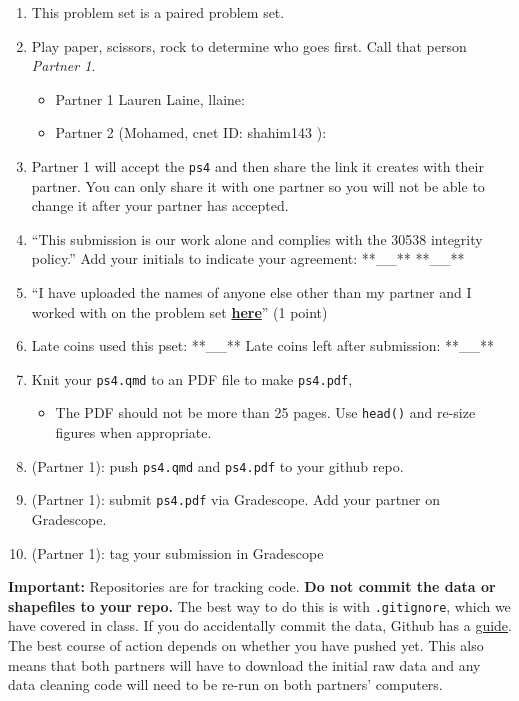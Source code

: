 \documentclass[
  letterpaper,
  DIV=11,
  numbers=noendperiod]{scrartcl}
\providecommand{\tightlist}{%
  \setlength{\itemsep}{0pt}\setlength{\parskip}{0pt}}\usepackage{longtable,booktabs,array}
\begin{document}
\begin{enumerate}
\def\labelenumi{\arabic{enumi}.}
\tightlist
\item
  This problem set is a paired problem set.
\item
  Play paper, scissors, rock to determine who goes first. Call that
  person \emph{Partner 1}.

  \begin{itemize}
  \tightlist
  \item
    Partner 1 Lauren Laine, llaine:
  \item
    Partner 2 (Mohamed, cnet ID: shahim143 ):
  \end{itemize}
\item
  Partner 1 will accept the \texttt{ps4} and then share the link it
  creates with their partner. You can only share it with one partner so
  you will not be able to change it after your partner has accepted.
\item
  ``This submission is our work alone and complies with the 30538
  integrity policy.'' Add your initials to indicate your agreement:
  **\_\_** **\_\_**
\item
  ``I have uploaded the names of anyone else other than my partner and I
  worked with on the problem set
  \textbf{\href{https://docs.google.com/forms/d/185usrCREQaUbvAXpWhChkjghdGgmAZXA3lPWpXLLsts/edit}{here}}''
  (1 point)
\item
  Late coins used this pset: **\_\_** Late coins left after submission:
  **\_\_**
\item
  Knit your \texttt{ps4.qmd} to an PDF file to make \texttt{ps4.pdf},

  \begin{itemize}
  \tightlist
  \item
    The PDF should not be more than 25 pages. Use \texttt{head()} and
    re-size figures when appropriate.
  \end{itemize}
\item
  (Partner 1): push \texttt{ps4.qmd} and \texttt{ps4.pdf} to your github
  repo.
\item
  (Partner 1): submit \texttt{ps4.pdf} via Gradescope. Add your partner
  on Gradescope.
\item
  (Partner 1): tag your submission in Gradescope
\end{enumerate}

\textbf{Important:} Repositories are for tracking code. \textbf{Do not
commit the data or shapefiles to your repo.} The best way to do this is
with \texttt{.gitignore}, which we have covered in class. If you do
accidentally commit the data, Github has a
\href{https://docs.github.com/en/repositories/working-with-files/managing-large-files/about-large-files-on-github\#removing-files-from-a-repositorys-history}{guide}.
The best course of action depends on whether you have pushed yet. This
also means that both partners will have to download the initial raw data
and any data cleaning code will need to be re-run on both partners'
computers.
\end{document}
